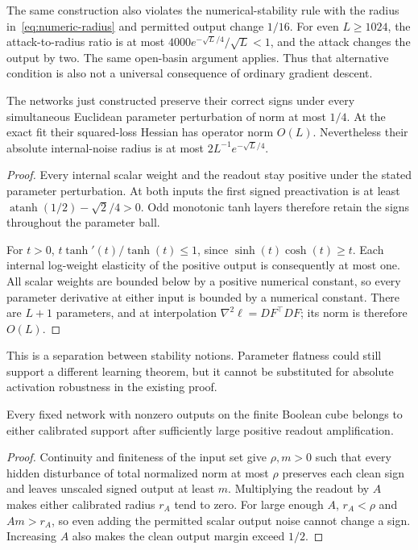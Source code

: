 The same construction also violates the numerical-stability rule with
the radius in~\eqref{eq:numeric-radius} and permitted output change $1/16$.
For even $L\ge1024$, the attack-to-radius ratio is at most
$4000e^{-\sqrt L/4}/\sqrt L<1$, and the attack changes the output by two.
The same open-basin argument applies. Thus that alternative condition is
also not a universal consequence of ordinary gradient descent.

\begin{proposition}
The networks just constructed preserve their correct signs under every
simultaneous Euclidean parameter perturbation of norm at most $1/4$.
At the exact fit their squared-loss Hessian has operator norm $O(L)$.
Nevertheless their absolute internal-noise radius is at most
$2L^{-1}e^{-\sqrt L/4}$.
\end{proposition}
\begin{proof}
Every internal scalar weight and the readout stay positive under the stated
parameter perturbation. At both inputs the first signed preactivation is
at least $\operatorname{atanh}(1/2)-\sqrt2/4>0$. Odd monotonic tanh
layers therefore retain the signs throughout the parameter ball.

For $t>0$, $t\tanh'(t)/\tanh(t)\le1$, since
$\sinh(t)\cosh(t)\ge t$. Each internal log-weight elasticity of the
positive output is consequently at most one. All scalar weights are
bounded below by a positive numerical constant, so every parameter
derivative at either input is bounded by a numerical constant.
There are $L+1$ parameters, and at interpolation
$\nabla^2\ell=DF^\top DF$; its norm is therefore $O(L)$.
\end{proof}

This is a separation between stability notions. Parameter flatness could
still support a different learning theorem, but it cannot be substituted
for absolute activation robustness in the existing proof.

\begin{proposition}
Every fixed network with nonzero outputs on the finite Boolean cube belongs
to either calibrated support after sufficiently large positive readout
amplification.
\end{proposition}
\begin{proof}
Continuity and finiteness of the input set give $\rho,m>0$ such that every
hidden disturbance of total normalized norm at most $\rho$ preserves each
clean sign and leaves unscaled signed output at least $m$.
Multiplying the readout by $A$ makes either calibrated radius $r_A$ tend
to zero. For large enough $A$, $r_A<\rho$ and $Am>r_A$, so even adding
the permitted scalar output noise cannot change a sign. Increasing $A$
also makes the clean output margin exceed $1/2$.
\end{proof}

